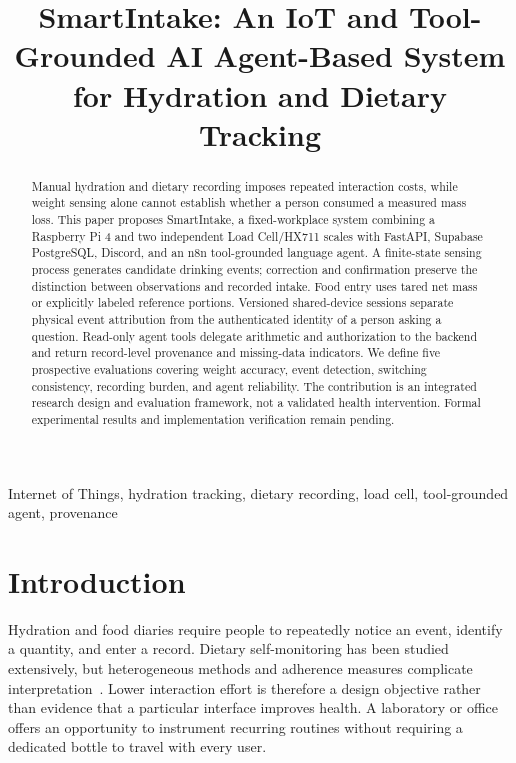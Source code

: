 \documentclass[conference]{IEEEtran}
\begin{document}
\title{SmartIntake: An IoT and Tool-Grounded AI Agent-Based System for Hydration and Dietary Tracking}
\author{
}
\maketitle
\begin{abstract}
Manual hydration and dietary recording imposes repeated interaction costs, while weight sensing alone cannot establish whether a person consumed a measured mass loss. This paper proposes SmartIntake, a fixed-workplace system combining a Raspberry Pi 4 and two independent Load Cell/HX711 scales with FastAPI, Supabase PostgreSQL, Discord, and an n8n tool-grounded language agent. A finite-state sensing process generates candidate drinking events; correction and confirmation preserve the distinction between observations and recorded intake. Food entry uses tared net mass or explicitly labeled reference portions. Versioned shared-device sessions separate physical event attribution from the authenticated identity of a person asking a question. Read-only agent tools delegate arithmetic and authorization to the backend and return record-level provenance and missing-data indicators. We define five prospective evaluations covering weight accuracy, event detection, switching consistency, recording burden, and agent reliability. The contribution is an integrated research design and evaluation framework, not a validated health intervention. Formal experimental results and implementation verification remain pending.
\end{abstract}

\begin{IEEEkeywords}Internet of Things, hydration tracking, dietary recording, load cell, tool-grounded agent, provenance\end{IEEEkeywords}
\section{Introduction}\label{sec:intro}
Hydration and food diaries require people to repeatedly notice an event, identify a quantity, and enter a record. Dietary self-monitoring has been studied extensively, but heterogeneous methods and adherence measures complicate interpretation~\cite{burke2011}. Lower interaction effort is therefore a design objective rather than evidence that a particular interface improves health. A laboratory or office offers an opportunity to instrument recurring routines without requiring a dedicated bottle to travel with every user.
\end{document}
